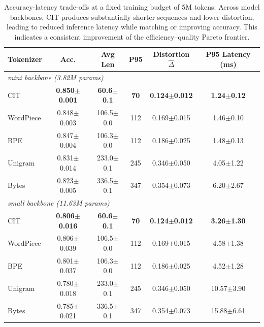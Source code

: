 \begin{table}[t]
\centering
\scriptsize
\setlength{\tabcolsep}{3.5pt}
\begin{tabular*}{\columnwidth}{@{\extracolsep{\fill}}lccccc@{}}
\toprule
Tokenizer & Acc. & Avg Len & P95 & Distortion $\hat{\Delta}$ & P95 Latency (ms) \\
\midrule
\multicolumn{6}{l}{\textit{mini backbone (3.82M params)}}\\
CIT        & \textbf{0.850$\pm$0.001} & \textbf{60.6$\pm$0.1} & \textbf{70}  & \textbf{0.124$\pm$0.012} & \textbf{1.24$\pm$0.12} \\
WordPiece  & 0.848$\pm$0.003 & 106.5$\pm$0.0 & 112 & 0.169$\pm$0.015 & 1.46$\pm$0.10 \\
BPE        & 0.847$\pm$0.004 & 106.3$\pm$0.0 & 112 & 0.186$\pm$0.025 & 1.48$\pm$0.13 \\
Unigram    & 0.831$\pm$0.014 & 233.0$\pm$0.1 & 245 & 0.346$\pm$0.050 & 4.05$\pm$1.22 \\
Bytes      & 0.823$\pm$0.005 & 336.5$\pm$0.1 & 347 & 0.354$\pm$0.073 & 6.20$\pm$2.67 \\
\midrule
\multicolumn{6}{l}{\textit{small backbone (11.63M params)}}\\
CIT        & \textbf{0.806$\pm$0.016} & \textbf{60.6$\pm$0.1} & \textbf{70}  & \textbf{0.124$\pm$0.012} & \textbf{3.26$\pm$1.30} \\
WordPiece  & 0.806$\pm$0.039 & 106.5$\pm$0.0 & 112 & 0.169$\pm$0.015 & 4.58$\pm$1.38 \\
BPE        & 0.801$\pm$0.037 & 106.3$\pm$0.0 & 112 & 0.186$\pm$0.025 & 4.52$\pm$1.28 \\
Unigram    & 0.780$\pm$0.018 & 233.0$\pm$0.1 & 245 & 0.346$\pm$0.050 & 10.57$\pm$3.90 \\
Bytes      & 0.785$\pm$0.021 & 336.5$\pm$0.1 & 347 & 0.354$\pm$0.073 & 15.88$\pm$6.61 \\
\bottomrule
\end{tabular*}

\caption{Accuracy-latency trade-offs at a fixed training budget of 5M tokens. Across model backbones, CIT produces substantially shorter sequences and lower distortion, leading to reduced inference latency while matching or improving accuracy. This indicates a consistent improvement of the efficiency--quality Pareto frontier.}

\label{tab:e3_pareto}
\end{table}

